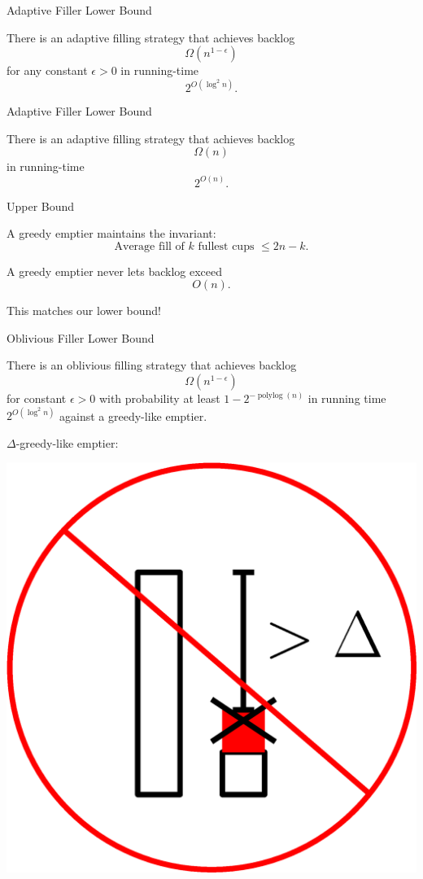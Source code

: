 \documentclass[xcolor=x11names, svgnames, rgb]{beamer}
\newcommand{\polylog}{\operatorname{polylog}}
\begin{document}
\begin{frame}[t]{Adaptive Filler Lower Bound}
  \begin{theorem}
    There is an adaptive filling strategy that achieves
    backlog $$\Omega(n^{1-\epsilon})$$ for any constant $\epsilon >0$ in running-time $$2^{O(\log^2 n)}.$$
  \end{theorem}
\end{frame}
\begin{frame}[t]{Adaptive Filler Lower Bound}
  \begin{theorem}
    There is an adaptive filling strategy that achieves backlog $$\Omega(n)$$ in running-time $$2^{O(n)}.$$
  \end{theorem}
\end{frame}
\begin{frame}[t]{Upper Bound}
  \begin{theorem}
    A greedy emptier maintains the invariant: 
    $$\text{Average fill of $k$ fullest cups } \le 2n-k.$$
  \end{theorem}

  \begin{corollary}
  A greedy emptier never lets backlog exceed $$O(n).$$
  \end{corollary}

  \vspace{0.3cm}
  This matches our lower bound!
\end{frame}
\begin{frame}[t]{Oblivious Filler Lower Bound}
  \begin{theorem}
    There is an oblivious filling strategy that achieves backlog
    $$\Omega(n^{1-\epsilon})$$ for constant $\epsilon > 0$ with probability at
    least $1-2^{-\polylog(n)}$ in running time $2^{O(\log^2 n)}$ against a greedy-like emptier.
  \end{theorem}

  $\Delta$-greedy-like emptier:

  \includegraphics[width=0.3\linewidth]{greedyLike/greedyLike.eps}

\end{frame}
\end{document}
